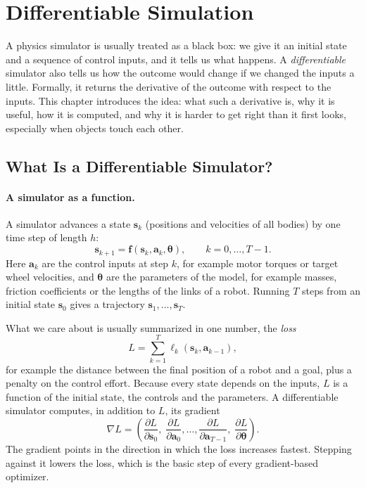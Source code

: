 \section{Differentiable Simulation}
\label{sec:diffsim}

A physics simulator is usually treated as a black box: we give it an
initial state and a sequence of control inputs, and it tells us what
happens. A \emph{differentiable} simulator also tells us how the outcome
would change if we changed the inputs a little. Formally, it returns the
derivative of the outcome with respect to the inputs. This chapter
introduces the idea: what such a derivative is, why it is useful, how it is
computed, and why it is harder to get right than it first looks, especially
when objects touch each other.

\subsection{What Is a Differentiable Simulator?}
\label{sec:diffsim-what}

\paragraph{A simulator as a function.}
A simulator advances a state $\mathbf{s}_k$ (positions and velocities of
all bodies) by one time step of length $h$:
\begin{equation}
  \mathbf{s}_{k+1} = \mathbf{f}(\mathbf{s}_k, \mathbf{a}_k, \boldsymbol{\theta}),
  \qquad k = 0, \dots, T-1 .
  \label{eq:diffsim-step}
\end{equation}
Here $\mathbf{a}_k$ are the control inputs at step $k$, for example motor
torques or target wheel velocities, and $\boldsymbol{\theta}$ are the
parameters of the model, for example masses, friction coefficients or the
lengths of the links of a robot. Running $T$ steps from an initial state
$\mathbf{s}_0$ gives a trajectory $\mathbf{s}_1, \dots, \mathbf{s}_T$.

What we care about is usually summarized in one number, the \emph{loss}
\begin{equation}
  L = \sum_{k=1}^{T} \ell_k(\mathbf{s}_k, \mathbf{a}_{k-1}) ,
  \label{eq:diffsim-loss}
\end{equation}
for example the distance between the final position of a robot and a
goal, plus a penalty on the control effort. Because every state depends on
the inputs, $L$ is a function of the initial state, the controls and the
parameters. A differentiable simulator computes, in addition to $L$, its
gradient
\begin{equation}
  \nabla L = \left(
    \frac{\partial L}{\partial \mathbf{s}_0},\;
    \frac{\partial L}{\partial \mathbf{a}_0}, \dots,
    \frac{\partial L}{\partial \mathbf{a}_{T-1}},\;
    \frac{\partial L}{\partial \boldsymbol{\theta}}
  \right) .
\end{equation}
The gradient points in the direction in which the loss increases fastest.
Stepping against it lowers the loss, which is the basic step of every
gradient-based optimizer.

